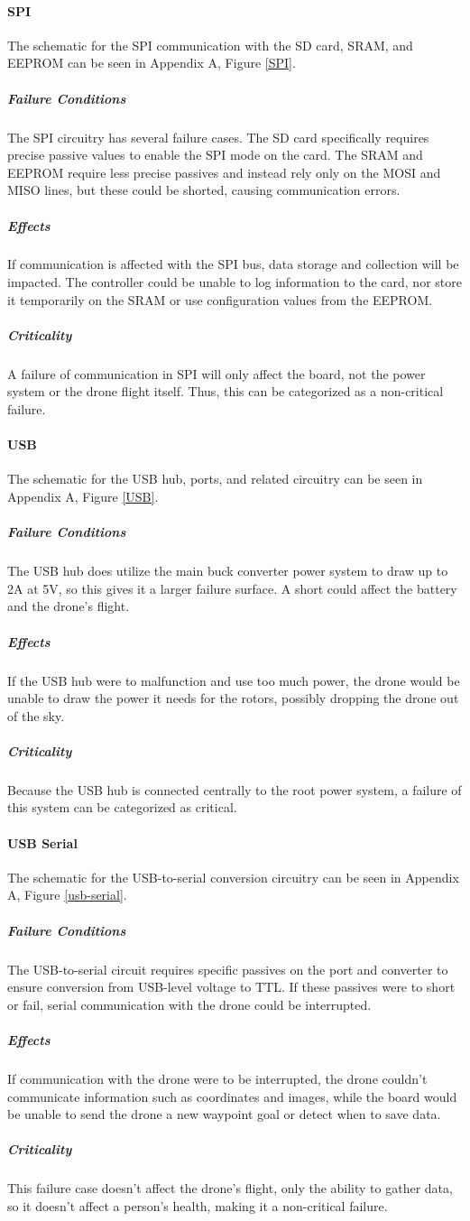 \documentclass[12pt]{article}
\begin{document}
\paragraph{SPI}
\par The schematic for the SPI communication with the SD card, SRAM, and EEPROM can be seen in Appendix A, Figure \ref{SPI}.
\subparagraph{Failure Conditions}
The SPI circuitry has several failure cases. The SD card specifically requires precise passive values to enable the SPI mode on the card. The SRAM and EEPROM require less precise passives and instead rely only on the MOSI and MISO lines, but these could be shorted, causing communication errors.
\subparagraph{Effects}
If communication is affected with the SPI bus, data storage and collection will be impacted. The controller could be unable to log information to the card, nor store it temporarily on the SRAM or use configuration values from the EEPROM.
\subparagraph{Criticality}
A failure of communication in SPI will only affect the board, not the power system or the drone flight itself. Thus, this can be categorized as a non-critical failure.
\paragraph{USB}
\par The schematic for the USB hub, ports, and related circuitry can be seen in Appendix A, Figure \ref{USB}.
\subparagraph{Failure Conditions}
The USB hub does utilize the main buck converter power system to draw up to 2A at 5V, so this gives it a larger failure surface. A short could affect the battery and the drone's flight.
\subparagraph{Effects}
If the USB hub were to malfunction and use too much power, the drone would be unable to draw the power it needs for the rotors, possibly dropping the drone out of the sky.
\subparagraph{Criticality}
Because the USB hub is connected centrally to the root power system, a failure of this system can be categorized as critical.
\paragraph{USB Serial}
\par The schematic for the USB-to-serial conversion circuitry can be seen in Appendix A, Figure \ref{usb-serial}.
\subparagraph{Failure Conditions}
The USB-to-serial circuit requires specific passives on the port and converter to ensure conversion from USB-level voltage to TTL. If these passives were to short or fail, serial communication with the drone could be interrupted.
\subparagraph{Effects}
If communication with the drone were to be interrupted, the drone couldn't communicate information such as coordinates and images, while the board would be unable to send the drone a new waypoint goal or detect when to save data.
\subparagraph{Criticality}
This failure case doesn't affect the drone's flight, only the ability to gather data, so it doesn't affect a person's health, making it a non-critical failure.
\end{document}
